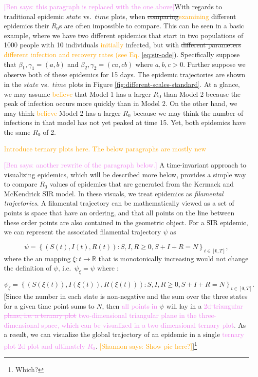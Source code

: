 \documentclass[
  shortnames]{jss}
\begin{document}
\textcolor{violet}{[Ben says: this paragraph is replaced with the one above]}With
regards to traditional epidemic \(state\) vs.~\(time\) plots, when
\sout{comparing}\textcolor{orange}{examining} different epidemics their
\(R_0\)s are often impossible to compare. This can be seen in a basic
example, where we have two different epidemics that start in two
populations of 1000 people with 10 individuals
\textcolor{orange}{initially} infected, but with
\sout{different parameters}
\textcolor{orange}{different infection and recovery rates (see Eq. \ref{eq:sir-ode}}).
Specifically suppose that \(\beta_1, \gamma_1 = (a,b)\) and
\(\beta_2, \gamma_2 = (ca,cb)\) where \(a, b, c > 0\). Further suppose
we observe both of these epidemics for 15 days. The epidemic
trajectories are shown in the \(state\) vs.~\(time\) plots in Figure
\ref{fig:different-scales-standard}. At a glance, we may \sout{assume}
\textcolor{orange}{believe} that Model 1 has a larger \(R_0\) than Model
2 because the peak of infection occurs more quickly than in Model 2. On
the other hand, we may \sout{think} \textcolor{orange}{believe} Model 2
has a larger \(R_0\) because we may think the number of infections in
that model has not yet peaked at time 15. Yet, both epidemics have the
same \(R_0\) of 2.

\textcolor{orange}{Introduce ternary plots here.  The below paragraphs are mostly new}

\textcolor{violet}{[Ben says: another rewrite of the paragraph below.]}
A time-invariant approach to visualizing epidemics, which will be
described more below, provides a simple way to compare \(R_0\) values of
epidemics that are generated from the Kermack and McKendrick SIR model.
In these visuals, we treat epidemics as
\textit{filamental trajectories}. A filamental trajectory can be
mathematically viewed as a set of points is space that have an ordering,
and that all points on the line between these order points are also
contained in the geometric object. For a SIR epidemic, we can represent
the associated filamental trajectory \(\psi\) as

\[
\psi = \left \{(S(t), I(t), R(t)): S, I, R \ge 0, S + I + R = N \right \}_{t\in[0,T]},
\] where the an mapping \(\xi : t \to \mathbb{R}\) that is monotonically
increasing would not change the definition of \(\psi\),
i.e.~\(\psi_\xi = \psi\) where :

\[
\psi_\xi = \left \{(S(\xi(t)), I(\xi(t)), R(\xi(t))): S, I, R \ge 0, S + I + R = N \right \}_{t\in[0,T]}.
\] {[}Since the number in each state is non-negative and the sum over
the three states for a given time point sums to \(N\), then
\textcolor{violet}{all points in} \(\psi\) will lay in a
\textcolor{violet}{\sout{2d triangular plane, i.e. a ternary plot}}
\textcolor{violet}{two-dimensional triangular plane in the three-dimensional space, which can be visualized in a two-dimensional ternary plot}.
As a result, we can visualize the global trajectory of an epidemic in a
single
\textcolor{violet}{ternary plot \sout{2d plot and ultimately $R_0$}}.
\textcolor{orange}{[Shannon says: Show pic here?]}{]}\footnote{Which?}
\end{document}
